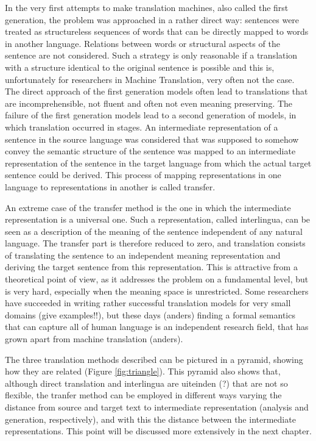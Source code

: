 \documentclass{report}
\theoremstyle{definition}
\theoremstyle{plain}
\begin{document}
In the very first attempts to make translation machines, also called the first generation, the problem was approached in a rather direct way: sentences were treated as structureless sequences of words that can be directly mapped to words in another language. Relations between words or structural aspects of the sentence are not considered. Such a strategy is only reasonable if a translation with a structure identical to the original sentence is possible and this is, unfortunately for researchers in Machine Translation, very often not the case. The direct approach of the first generation models often lead to translations that are incomprehensible, not fluent and often not even meaning preserving.
The failure of the first generation models lead to a second generation of models, in which translation occurred in stages. An intermediate representation of a sentence in the source language was considered that was supposed to somehow convey the semantic structure of the sentence was mapped to an intermediate representation of the sentence in the target language from which the actual target sentence could be derived. This process of mapping representations in one language to representations in another is called transfer.

An extreme case of the transfer method is the one in which the intermediate representation is a universal one. Such a representation, called interlingua, can be seen as a description of the meaning of the sentence independent of any natural language. The transfer part is therefore reduced to zero, and translation consists of translating the sentence to an independent meaning representation and deriving the target sentence from this representation. This is attractive from a theoretical point of view, as it addresses the problem on a fundamental level, but is very hard, especially when the meaning space is unrestricted. Some researchers have succeeded in writing rather successful translation models for very small domains (give examples!!), but these days (anders) finding a formal semantics that can capture all of human language is an independent research field, that has grown apart from machine translation (anders).

The three translation methods described can be pictured in a pyramid, showing how they are related (Figure \ref{fig:triangle}). This pyramid also shows that, although direct translation and interlingua are uiteinden (?) that are not so flexible, the tranfer method can be employed in different ways varying the distance from source and target text to intermediate representation (analysis and generation, respectively), and with this the distance between the intermediate representations. This point will be discussed more extensively in the next chapter.
\end{document}
